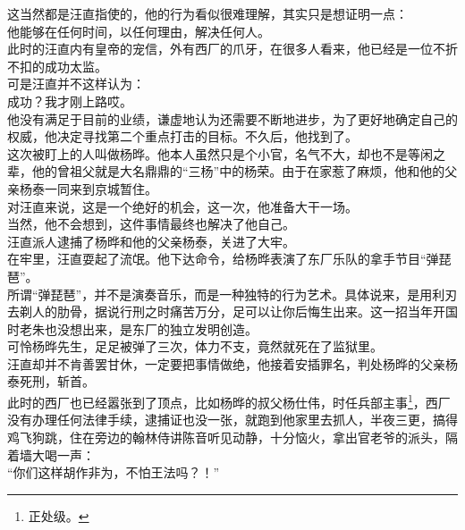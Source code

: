 \begin{multicols}{\theparacolNo}
这当然都是汪直指使的，他的行为看似很难理解，其实只是想证明一点：\\

他能够在任何时间，以任何理由，解决任何人。\\

此时的汪直内有皇帝的宠信，外有西厂的爪牙，在很多人看来，他已经是一位不折不扣的成功太监。\\

可是汪直并不这样认为：\\

成功？我才刚上路哎。\\

他没有满足于目前的业绩，谦虚地认为还需要不断地进步，为了更好地确定自己的权威，他决定寻找第二个重点打击的目标。不久后，他找到了。\\

这次被盯上的人叫做杨晔。他本人虽然只是个小官，名气不大，却也不是等闲之辈，他的曾祖父就是大名鼎鼎的“三杨”中的杨荣。由于在家惹了麻烦，他和他的父亲杨泰一同来到京城暂住。\\

对汪直来说，这是一个绝好的机会，这一次，他准备大干一场。\\

当然，他不会想到，这件事情最终也解决了他自己。\\

汪直派人逮捕了杨晔和他的父亲杨泰，关进了大牢。\\

在牢里，汪直耍起了流氓。他下达命令，给杨晔表演了东厂乐队的拿手节目“弹琵琶”。\\

所谓“弹琵琶”，并不是演奏音乐，而是一种独特的行为艺术。具体说来，是用利刃去剃人的肋骨，据说行刑之时痛苦万分，足可以让你后悔生出来。这一招当年开国时老朱也没想出来，是东厂的独立发明创造。\\

可怜杨晔先生，足足被弹了三次，体力不支，竟然就死在了监狱里。\\

汪直却并不肯善罢甘休，一定要把事情做绝，他接着安插罪名，判处杨晔的父亲杨泰死刑，斩首。\\

此时的西厂也已经嚣张到了顶点，比如杨晔的叔父杨仕伟，时任兵部主事\footnote{正处级。}，西厂没有办理任何法律手续，逮捕证也没一张，就跑到他家里去抓人，半夜三更，搞得鸡飞狗跳，住在旁边的翰林侍讲陈音听见动静，十分恼火，拿出官老爷的派头，隔着墙大喝一声：\\

“你们这样胡作非为，不怕王法吗？！”\\


\end{multicols}
